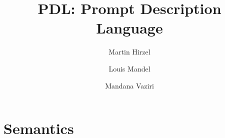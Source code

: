 \documentclass{article}
\title{PDL: Prompt Description Language}
\author{Martin Hirzel \and Louis Mandel \and Mandana Vaziri}
\begin{document}
\maketitle

\section{Semantics}


\renewcommand{\mit}[1]{\mathit{#1}}
\newcommand{\mtt}[1]{\texttt{#1}}



\newcommand{\True}{\mit{tt}}
\newcommand{\False}{\mit{ff}}

\newcommand{\jsnull}{\ensuremath{\mtt{null}}}
\newcommand{\jsstr}[1]{\ensuremath{\texttt{"}{#1}\texttt{"}}}
\newcommand{\jsobj}[1]{\ensuremath{\texttt{\{}{#1}\texttt{\}}}}
\newcommand{\jsarr}[1]{\ensuremath{\texttt{[}{#1}\texttt{]}}}
\end{document}
